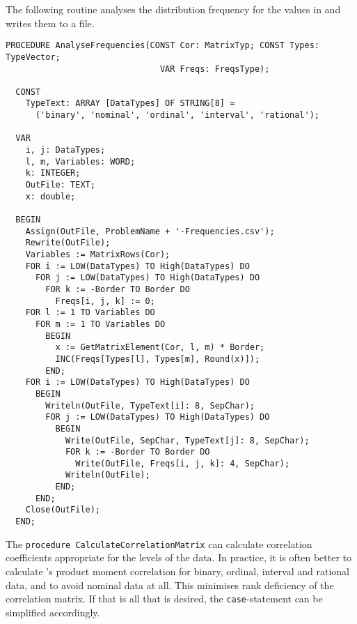 The following routine analyses the distribution frequency for the values in  and writes them to a file.

\begin{lstlisting}[caption=Determine frequency distribution of correlation coefficients]
  PROCEDURE AnalyseFrequencies(CONST Cor: MatrixTyp; CONST Types: TypeVector;
                               VAR Freqs: FreqsType);

  CONST
    TypeText: ARRAY [DataTypes] OF STRING[8] =
      ('binary', 'nominal', 'ordinal', 'interval', 'rational');

  VAR
    i, j: DataTypes;
    l, m, Variables: WORD;
    k: INTEGER;
    OutFile: TEXT;
    x: double;

  BEGIN
    Assign(OutFile, ProblemName + '-Frequencies.csv');
    Rewrite(OutFile);
    Variables := MatrixRows(Cor);
    FOR i := LOW(DataTypes) TO High(DataTypes) DO
      FOR j := LOW(DataTypes) TO High(DataTypes) DO
        FOR k := -Border TO Border DO
          Freqs[i, j, k] := 0;
    FOR l := 1 TO Variables DO
      FOR m := 1 TO Variables DO
        BEGIN
          x := GetMatrixElement(Cor, l, m) * Border;
          INC(Freqs[Types[l], Types[m], Round(x)]);
        END;
    FOR i := LOW(DataTypes) TO High(DataTypes) DO
      BEGIN
        Writeln(OutFile, TypeText[i]: 8, SepChar);
        FOR j := LOW(DataTypes) TO High(DataTypes) DO
          BEGIN
            Write(OutFile, SepChar, TypeText[j]: 8, SepChar);
            FOR k := -Border TO Border DO
              Write(OutFile, Freqs[i, j, k]: 4, SepChar);
            Writeln(OutFile);
          END;
      END;
    Close(OutFile);
  END;
\end{lstlisting}

The \texttt{procedure CalculateCorrelationMatrix} can calculate correlation coefficients appropriate for the levels of the data. In practice, it is often better to calculate 's product moment correlation  for binary, ordinal, interval and rational data, and to avoid nominal data at all. This minimises rank deficiency of the correlation matrix. If that is all that is desired, the \texttt{case}-statement can be simplified accordingly.

